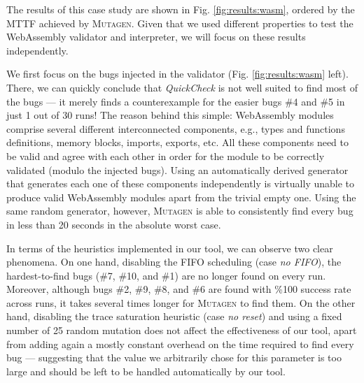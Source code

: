 \documentclass[acmsmall, anonymous]{acmart}
\newcommand{\quickcheck}{\textit{QuickCheck}\xspace}
\newcommand{\mutagen}{\textsc{Mutagen}\xspace}
\begin{document}
The results of this case study are shown in Fig. \ref{fig:results:wasm}, ordered
by the MTTF achieved by \mutagen.
%
Given that we used different properties to test the WebAssembly validator and
interpreter, we will focus on these results independently.


We first focus on the bugs injected in the validator (Fig.
\ref{fig:results:wasm} left).
%
There, we can quickly conclude that \quickcheck is not well suited to find most
of the bugs --- it merely finds a counterexample for the easier bugs \#4 and \#5
in just 1 out of 30 runs!
%
The reason behind this simple: WebAssembly modules comprise several different
interconnected components, e.g., types and functions definitions, memory blocks,
imports, exports, etc.
%
All these components need to be valid and agree with each other in order for the
module to be correctly validated (modulo the injected bugs).
%
Using an automatically derived generator that generates each one of these
components independently is virtually unable to produce valid WebAssembly
modules apart from the trivial empty one.
%
Using the same random generator, however, \mutagen is able to consistently find
every bug in less than 20 seconds in the absolute worst case.


In terms of the heuristics implemented in our tool, we can observe two clear
phenomena.
%
On one hand, disabling the FIFO scheduling (case \textit{no FIFO}), the
hardest-to-find bugs (\#7, \#10, and \#1) are no longer found on every run.
%
Moreover, although bugs \#2, \#9, \#8, and \#6 are found with \%100 success rate
across runs, it takes several times longer for \mutagen to find them.
%
On the other hand, disabling the trace saturation heuristic (case \textit{no
  reset}) and using a fixed number of 25 random mutation does not affect the
effectiveness of our tool, apart from adding again a mostly constant overhead on
the time required to find every bug --- suggesting that the value we arbitrarily
chose for this parameter is too large and should be left to be handled
automatically by our tool.
\end{document}
